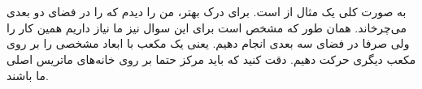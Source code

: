 \section{}
به صورت کلی
یک مثال از
است. برای درک بهتر، من
را دیدم که
را در فضای دو بعدی می‌چرخاند. همان طور که مشخص است برای این سوال نیز ما نیاز داریم همین کار را ولی صرفا در
فضای سه بعدی انجام دهیم. یعنی یک مکعب با ابعاد مشخصی را بر روی مکعب دیگری حرکت دهیم. دقت کنید که باید مرکز
حتما بر روی خانه‌های
ماتریس اصلی ما باشند.